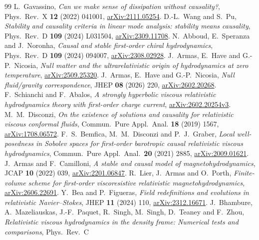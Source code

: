 \begin{thebibliography}{99}
L.~Gavassino, \emph{Can we make sense of dissipation without causality?},
Phys.\ Rev.\ X \textbf{12} (2022) 041001,
\href{https://arxiv.org/abs/2111.05254}{arXiv:2111.05254}.
D.-L.~Wang and S.~Pu, \emph{Stability and causality criteria in linear
mode analysis: stability means causality}, Phys.\ Rev.\ D \textbf{109}
(2024) L031504,
\href{https://arxiv.org/abs/2309.11708}{arXiv:2309.11708}.
N.~Abboud, E.~Speranza and J.~Noronha, \emph{Causal and stable first-order
chiral hydrodynamics}, Phys.\ Rev.\ D \textbf{109} (2024) 094007,
\href{https://arxiv.org/abs/2308.02928}{arXiv:2308.02928}.
J.~Armas, E.~Have and G.-P.~Nicosia, \emph{Null matter and the
ultrarelativistic origin of hydrodynamics at zero temperature},
\href{https://arxiv.org/abs/2509.25320}{arXiv:2509.25320}.
J.~Armas, E.~Have and G.-P.~Nicosia, \emph{Null fluid/gravity
correspondence}, JHEP \textbf{08} (2026) 220,
\href{https://arxiv.org/abs/2602.20268}{arXiv:2602.20268}.
F.~Schianchi and F.~Abalos, \emph{A strongly hyperbolic viscous
relativistic hydrodynamics theory with first-order charge current},
\href{https://arxiv.org/abs/2602.20254}{arXiv:2602.20254v3}.
M.~M.~Disconzi, \emph{On the existence of solutions and causality for
relativistic viscous conformal fluids}, Commun.\ Pure Appl.\ Anal.
\textbf{18} (2019) 1567,
\href{https://arxiv.org/abs/1708.06572}{arXiv:1708.06572}.
F.~S.~Bemfica, M.~M.~Disconzi and P.~J.~Graber, \emph{Local well-posedness
in Sobolev spaces for first-order barotropic causal relativistic viscous
hydrodynamics}, Commun.\ Pure Appl.\ Anal.\ \textbf{20} (2021) 2885,
\href{https://arxiv.org/abs/2009.01621}{arXiv:2009.01621}.
J.~Armas and F.~Camilloni, \emph{A stable and causal model of
magnetohydrodynamics}, JCAP \textbf{10} (2022) 039,
\href{https://arxiv.org/abs/2201.06847}{arXiv:2201.06847}.
R.~Lier, J.~Armas and O.~Porth, \emph{Finite-volume scheme for first-order
viscoresistive relativistic magnetohydrodynamics},
\href{https://arxiv.org/abs/2606.22691}{arXiv:2606.22691}.
Y.~Bea and P.~Figueras, \emph{Field redefinitions and evolutions in
relativistic Navier--Stokes}, JHEP \textbf{11} (2024) 110,
\href{https://arxiv.org/abs/2312.16671}{arXiv:2312.16671}.
J.~Bhambure, A.~Mazeliauskas, J.-F.~Paquet, R.~Singh, M.~Singh,
D.~Teaney and F.~Zhou, \emph{Relativistic viscous hydrodynamics in the
density frame: Numerical tests and comparisons}, Phys.\ Rev.\ C

\end{thebibliography}
